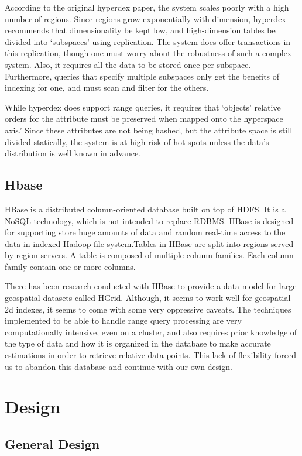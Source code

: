 \documentclass[11pt]{article}
\begin{document}
According to the original hyperdex paper, the system scales poorly with a high number of regions. Since regions grow exponentially with dimension, hyperdex recommends that dimensionality be kept low, and high-dimension tables be divided into `subspaces' using replication. The system does offer transactions in this replication, though one must worry about the robustness of such a complex system. Also, it requires all the data to be stored once per subspace. Furthermore, queries that specify multiple subspaces only get the benefits of indexing for one, and must scan and filter for the others.

While hyperdex does support range queries, it requires that `objects' relative orders for the attribute must be preserved when mapped onto the hyperspace axis.' Since these attributes are not being hashed, but the attribute space is still divided statically, the system is at high risk of hot spots unless the data's distribution is well known in advance.

\subsection{Hbase}

HBase is a distributed column-oriented database built on top of HDFS. It is a NoSQL technology, which is not intended to replace RDBMS. HBase is designed for supporting store huge amounts of data and random real-time access to the data in indexed Hadoop file system.Tables in HBase are split into regions served by region servers. A table is composed of multiple column families. Each column family contain one or more columns. 

There has been research conducted with HBase to provide a data model for large geospatial datasets called HGrid. Although, it seems to work well for geospatial 2d indexes, it seems to come with some very oppressive caveats. The techniques implemented to be able to handle range query processing are very computationally intensive, even on a cluster, and also requires prior knowledge of the type of data and how it is organized in the database to make accurate estimations in order to retrieve relative data points. This lack of flexibility forced us to abandon this database and continue with our own design.

\section{Design}

\subsection{General Design}
\end{document}

